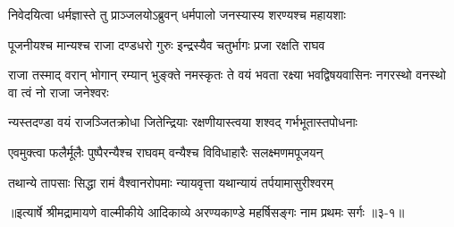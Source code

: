 \twolineshloka
{निवेदयित्वा धर्मज्ञास्ते तु प्राञ्जलयोऽब्रुवन्}
{धर्मपालो जनस्यास्य शरण्यश्च महायशाः} %

\twolineshloka
{पूजनीयश्च मान्यश्च राजा दण्डधरो गुरुः}
{इन्द्रस्यैव चतुर्भागः प्रजा रक्षति राघव} %

\threelineshloka
{राजा तस्माद् वरान् भोगान् रम्यान् भुङ्क्ते नमस्कृतः}
{ते वयं भवता रक्ष्या भवद्विषयवासिनः}
{नगरस्थो वनस्थो वा त्वं नो राजा जनेश्वरः} %

\twolineshloka
{न्यस्तदण्डा वयं राजञ्जितक्रोधा जितेन्द्रियाः}
{रक्षणीयास्त्वया शश्वद् गर्भभूतास्तपोधनाः} %

\twolineshloka
{एवमुक्त्वा फलैर्मूलैः पुष्पैरन्यैश्च राघवम्}
{वन्यैश्च विविधाहारैः सलक्ष्मणमपूजयन्} %

\twolineshloka
{तथान्ये तापसाः सिद्धा रामं वैश्वानरोपमाः}
{न्यायवृत्ता यथान्यायं तर्पयामासुरीश्वरम्} %


॥इत्यार्षे श्रीमद्रामायणे वाल्मीकीये आदिकाव्ये अरण्यकाण्डे महर्षिसङ्गः नाम प्रथमः सर्गः ॥३-१॥
